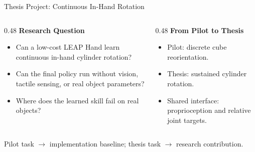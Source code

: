 \documentclass{beamer}
\begin{document}
\begin{frame}{Thesis Project: Continuous In-Hand Rotation}
    \small
    \vspace{0.75em}
    \begin{columns}[T,onlytextwidth]
        \begin{column}{0.48\textwidth}
            \textbf{\textcolor{maincolor}{Research Question}}
            \begin{itemize}
                \item Can a low-cost LEAP Hand learn continuous in-hand cylinder rotation?
                \item Can the final policy run without vision, tactile sensing, or real object parameters?
                \item Where does the learned skill fail on real objects?
            \end{itemize}
        \end{column}
        \begin{column}{0.48\textwidth}
            \textbf{\textcolor{maincolor}{From Pilot to Thesis}}
            \begin{itemize}
                \item Pilot: discrete cube reorientation.
                \item Thesis: sustained cylinder rotation.
                \item Shared interface: proprioception and relative joint targets.
            \end{itemize}
        \end{column}
    \end{columns}

    \vspace{0.45em}
    \centering
    \textcolor{maincolor}{Pilot task $\rightarrow$ implementation baseline; thesis task $\rightarrow$ research contribution.}
\end{frame}
\end{document}
